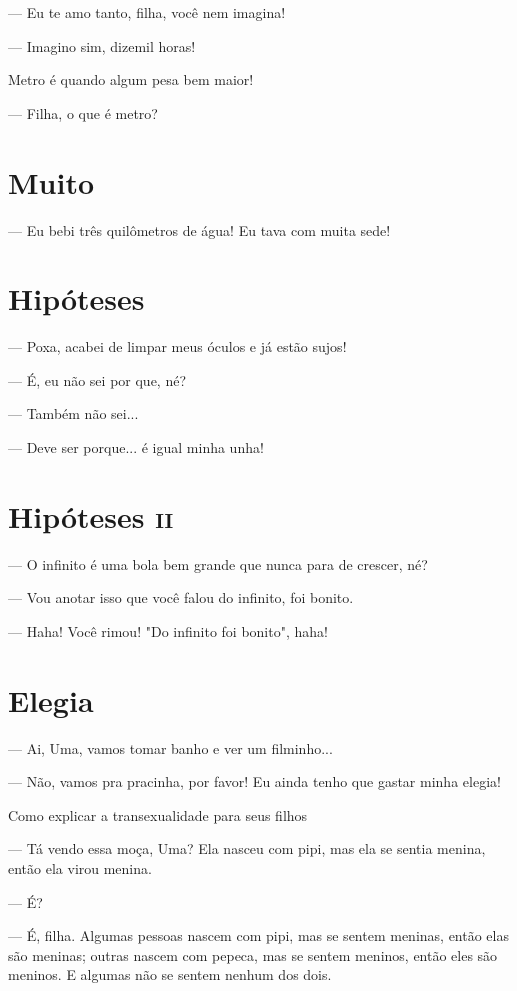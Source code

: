 — Eu te amo tanto, filha, você nem imagina!

— Imagino sim, dizemil horas!

Metro é quando algum pesa bem maior!

— Filha, o que é metro?

\chapter{Muito}

— Eu bebi três quilômetros de água! Eu tava com muita sede!

\chapter{Hipóteses}

— Poxa, acabei de limpar meus óculos e já estão sujos!

— É, eu não sei por que, né?

— Também não sei...

— Deve ser porque... é igual minha unha!

\chapter{Hipóteses \textsc{ii}}

— O infinito é uma bola bem grande que nunca para de crescer, né?

— Vou anotar isso que você falou do infinito, foi bonito.

— Haha! Você rimou! "Do infinito foi bonito", haha!

\chapter{Elegia}

— Ai, Uma, vamos tomar banho e ver um filminho...

— Não, vamos pra pracinha, por favor! Eu ainda tenho que gastar minha
elegia!

Como explicar a transexualidade para seus filhos

— Tá vendo essa moça, Uma? Ela nasceu com pipi, mas ela se sentia
menina, então ela virou menina.

— É?

— É, filha. Algumas pessoas nascem com pipi, mas se sentem meninas,
então elas são meninas; outras nascem com pepeca, mas se sentem meninos,
então eles são meninos. E algumas não se sentem nenhum dos dois.

